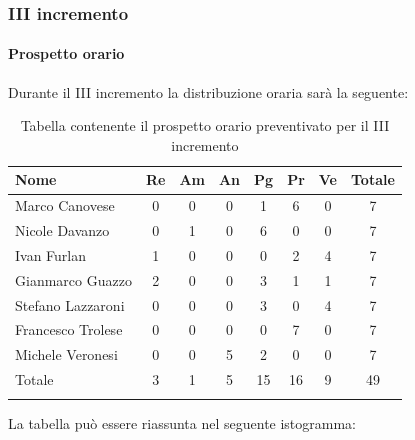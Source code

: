 \subsubsection{III incremento}
\paragraph{Prospetto orario}
Durante il III incremento la distribuzione oraria sarà la seguente:

\begin{longtable}{|l|c|c|c|c|c|c|c|}
	\hline
	\rowcolor{lighter-grayer}
	\textbf{Nome}     & \textbf{Re} & \textbf{Am} & \textbf{An} & \textbf{Pg} & \textbf{Pr} & \textbf{Ve} & \textbf{Totale} \\
	\hline
	\endfirsthead

	\hline
	Marco Canovese    & 0           & 0           & 0           & 1           & 6           & 0           & 7               \\
	\hline
	\hline
	Nicole Davanzo    & 0           & 1           & 0           & 6           & 0           & 0           & 7               \\
	\hline
	\hline
	Ivan Furlan       & 1           & 0           & 0           & 0           & 2           & 4           & 7               \\
	\hline
	\hline
	Gianmarco Guazzo  & 2           & 0           & 0           & 3           & 1           & 1           & 7               \\
	\hline
	\hline
	Stefano Lazzaroni & 0           & 0           & 0           & 3           & 0           & 4           & 7               \\
	\hline
	\hline
	Francesco Trolese & 0           & 0           & 0           & 0           & 7           & 0           & 7               \\
	\hline
	\hline
	Michele Veronesi  & 0           & 0           & 5           & 2           & 0           & 0           & 7               \\
	\hline
	\hline
	Totale            & 3           & 1           & 5          & 15           & 16           & 9          & 49              \\
	\hline
	\rowcolor{white}
	\caption{Tabella contenente il prospetto orario preventivato per il III incremento}
\end{longtable}


La tabella può essere riassunta nel seguente istogramma:

